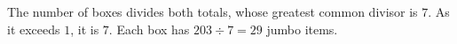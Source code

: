 The number of boxes divides both totals, whose greatest common divisor is $ 7 $. As it exceeds $ 1 $, it is $ 7 $. Each box has $ 203\div7=\boxed{29}$ jumbo items.
